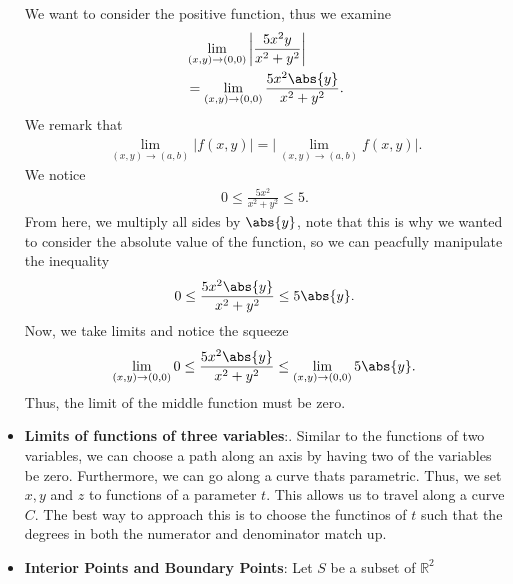 \documentclass{report}
\begin{document}
\begin{itemize}
                We want to consider the positive function, thus we examine
                \begin{align*}
                    &\lim\limits_{(x,y) \to (0,0)}{\bigg\lvert \frac{5x^{2}y}{x^{2}+y^{2}} \bigg\rvert} \\
                    &=\lim\limits_{(x,y) \to (0,0)}{\frac{5x^{2}\abs{y}}{x^{2}+y^{2}} }
                .\end{align*}
                \bigbreak \noindent 
                We remark that 
                \begin{align*}
                    \lim\limits_{(x,y) \to (a,b)}{\bigg\lvert f(x,y) \bigg\rvert} = \bigg\lvert \lim\limits_{(x,y) \to (a,b)}{f(x,y)} \bigg\rvert
                .\end{align*}
                \bigbreak \noindent 
                We notice
                \begin{align*}
                    0 \leq \frac{5x^{2}}{x^{2}+y^{2}} \leq 5
                .\end{align*}
                From here, we multiply all sides by $\abs{y}$, note that this is why we wanted to consider the absolute value of the function, so we can peacfully manipulate the inequality
                \begin{align*}
                    0 \leq \frac{5x^{2}\abs{y}}{x^{2}+y^{2}} \leq 5\abs{y}
                .\end{align*}
                Now, we take limits and notice the squeeze
                \begin{align*}
                    \lim\limits_{(x,y) \to (0,0)}{0} \leq \frac{5x^{2}\abs{y}}{x^{2}+y^{2}} \leq \lim\limits_{(x,y) \to (0,0)}{5\abs{y}}
                .\end{align*}
                \bigbreak \noindent 
                Thus, the limit of the middle function must be zero.
            \item \textbf{Limits of functions of three variables}:. Similar to the functions of two variables, we can choose a path along an axis by having two of the variables be zero. Furthermore, we can go along a curve thats parametric. Thus, we set $x,y$ and $z$ to functions of a parameter $t$. This allows us to travel along a curve $C$. The best way to approach this is to choose the functinos of $t$ such that the degrees in both the numerator and denominator match up.
            \item \textbf{Interior Points and Boundary Points}:
                Let $S$ be a subset of $\mathbb{R}^2$ 
                \begin{enumerate}[label=(\alph*)]

\end{enumerate}
\end{itemize}
\end{document}
